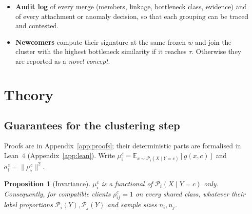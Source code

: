 \documentclass[11pt]{article}
\newtheorem{proposition}{Proposition}
\theoremstyle{definition}
\theoremstyle{remark}
\newcommand{\E}{\mathbb{E}}
\newcommand{\cP}{\mathcal{P}}
\begin{document}
\begin{itemize}[leftmargin=*,itemsep=1pt]
where $\bar s_i$ is the mean of the leave-one-out values and $s^{A}_{iM},s^{B}_{iM}$ use only half $A$ or half $B$ of client $i$, disattenuated with the split-half reliability $r_i^c$. In simulations with known population similarity on a grid of 144 settings (10--200 samples per half, 3--12 cluster members, 2--20 classes, same and different concepts; Table~\ref{tab:certgrid} in Appendix~\ref{app:more}), the standard error has the right scale: the standard deviation of $s_{iM}$ over draws is $0.8$--$1.5$ times the mean standard error in every setting. For a client of the same concept, however, the minimum over classes is biased downwards, by $1.6$ standard errors with two classes and $3.3$ with twenty, so the nominal $\pm2\,\mathrm{se}$ interval covers the population value in only about $30\%$ of draws (about $89\%$ after removing the bias). For a client of a different concept the bias is small and the coverage is about $80\%$, because the standard error is about $15\%$ too small. The verdict \emph{confident} is therefore conservative on the own-cluster side. The same bias makes the test $s_{\rm oth}+z\,\mathrm{se}_{\rm oth}<\tau$ on the other-cluster side easier to pass, i.e.\ anti-conservative. We do not claim nominal coverage; we report how often confident certificates are correct (Section~\ref{sec:exp}). Standard errors are conditional on the reference model $w$.
\item \textbf{Audit log} of every merge (members, linkage, bottleneck class, evidence) and of every attachment or anomaly decision, so that each grouping can be traced and contested.
\item \textbf{Newcomers} compute their signature at the same frozen $w$ and join the cluster with the highest bottleneck similarity if it reaches $\tau$. Otherwise they are reported as a \emph{novel concept}.
\end{itemize}

\section{Theory}\label{sec:theory}
\subsection{Guarantees for the clustering step}
Proofs are in Appendix~\ref{app:proofs}; their deterministic parts are formalised in Lean~4 (Appendix~\ref{app:lean}). Write $\mu_i^c=\E_{x\sim\cP_i(X\mid Y=c)}[g(x,c)]$ and $a_i^c=\|\mu_i^c\|^2$.

\begin{proposition}[Invariance]\label{prop:inv}
$\mu_i^c$ is a functional of $\cP_i(X\mid Y=c)$ only. Consequently, for compatible clients $\rho^c_{ij}=1$ on every shared class, whatever their label proportions $\cP_i(Y),\cP_j(Y)$ and sample sizes $n_i,n_j$.
\end{proposition}
\end{document}
